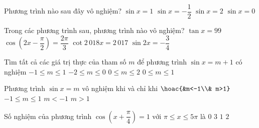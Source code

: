 \begin{ex}%
	Phương  trình nào sau đây vô nghiệm?
	\choice 
		 {$\sin x=1$}
		 {$\sin x=-\dfrac{1}{2}$}
		{\True $\sin x=2$} 
		 {$\sin x=0$}
\end{ex}

\begin{ex}%
	Trong các phương trình sau, phương trình nào  vô nghiệm?
	 \choice
		{$\tan  x=99$}
		{\True $\cos \left( 2x-\dfrac{\pi}{2}  \right)=\dfrac{2\pi}{3}$}
		 {$\cot 2\,018x=2\,017$}
		{$\sin  2x=-\dfrac{3}{4}$}
\end{ex}

\begin{ex}%
	Tìm tất  cả các giá trị thực của tham số $m$ để phương trình $\sin x = m+1$ có nghiệm
	\choice 
		{$-1  \leq m \leq 1$}
		{\True $-2 \leq m  \leq 0$}
		 {$0 \leq m \leq 2$}
		{$0  \leq m \leq 1$}
\end{ex}

\begin{ex}%
	 Phương trình $\sin x=m$ vô nghiệm khi và chỉ khi
	 \choice
		 {\True $\hoac{&m<-1\\& m>1}$}
		{$-1\le m\le 1$} 
		 {$m<-1$}
		 {$m>1$}
\end{ex}

\begin{ex}%
	Số nghiệm của  phương trình $\cos\left(x+\dfrac{\pi}{4}\right)=1$ với $\pi\leq x\leq 5\pi$ là
	\choice 
		{$0$} 
		{$3$} 
		 {$1$}
		 {\True $2$}
\end{ex}

